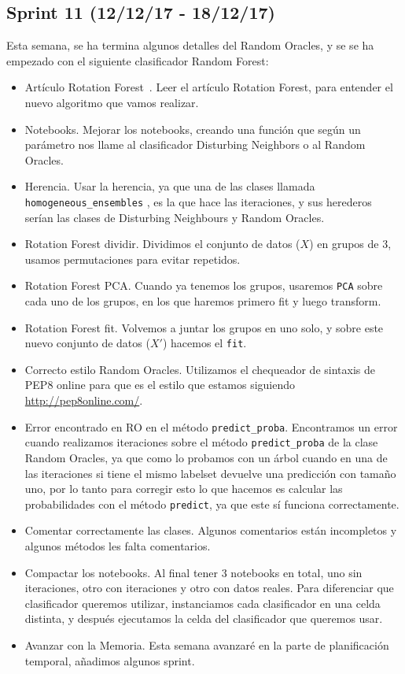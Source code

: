 \subsection{Sprint 11 (12/12/17 - 18/12/17)}
Esta semana, se ha termina algunos detalles del Random Oracles, y se se ha empezado con el siguiente clasificador Random Forest:
\begin{itemize}
\item Artículo Rotation Forest~\cite{rotationforest}. Leer el artículo Rotation Forest, para entender el nuevo algoritmo que vamos realizar.
\item Notebooks. Mejorar los notebooks, creando una función que según un parámetro nos llame al clasificador Disturbing Neighbors o al Random Oracles.
\item Herencia. Usar la herencia, ya que una de las clases llamada \texttt{homogeneous\_ensembles} , es la que hace las iteraciones, y sus herederos serían las clases de Disturbing Neighbours y Random Oracles.
\item Rotation Forest dividir. Dividimos el conjunto de datos ($X$) en grupos de 3, usamos permutaciones para evitar repetidos.
\item Rotation Forest PCA. Cuando ya tenemos los grupos, usaremos \texttt{PCA} sobre cada uno de los grupos, en los que haremos primero fit y luego transform.
\item Rotation Forest fit. Volvemos a juntar los grupos en uno solo, y sobre este nuevo conjunto de datos ($X'$) hacemos el \texttt{fit}.
\item Correcto estilo Random Oracles. Utilizamos el chequeador de sintaxis de PEP8 online para que es el estilo que estamos siguiendo \url{http://pep8online.com/}.
\item Error encontrado en RO en el método \texttt{predict\_proba}. Encontramos un error cuando realizamos iteraciones sobre el método \texttt{predict\_proba} de la clase Random Oracles, ya que como lo probamos con un árbol cuando en una de las iteraciones si tiene el mismo labelset devuelve una predicción con tamaño uno, por lo tanto para corregir esto lo que hacemos es calcular las probabilidades con el método \texttt{predict}, ya que este sí funciona correctamente.
\item Comentar correctamente las clases. Algunos comentarios están incompletos y algunos métodos les falta comentarios.
\item Compactar los notebooks. Al final tener 3 notebooks en total, uno sin iteraciones, otro con iteraciones y otro con datos reales. Para diferenciar que clasificador queremos utilizar, instanciamos cada clasificador en una celda distinta, y después ejecutamos la celda del clasificador que queremos usar.
\item Avanzar con la Memoria. Esta semana avanzaré en la parte de planificación temporal, añadimos algunos sprint.
\end{itemize}

